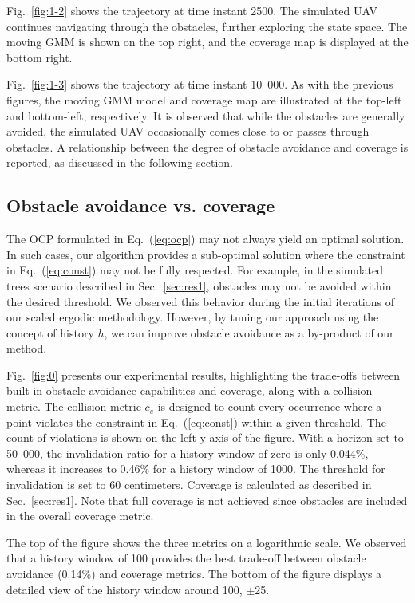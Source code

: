 \documentclass[letterpaper,10pt,conference,twoside]{IEEEtran}
\theoremstyle{definition}
\begin{document}
Fig.~\ref{fig:1-2} shows the trajectory at time instant 2500. The simulated UAV continues navigating through the obstacles, further exploring the state space. The moving GMM is shown on the top right, and the coverage map is displayed at the bottom right.

Fig.~\ref{fig:1-3} shows the trajectory at time instant 10~000. As with the previous figures, the moving GMM model and coverage map are illustrated at the top-left and bottom-left, respectively. It is observed that while the obstacles are generally avoided, the simulated UAV occasionally comes close to or passes through obstacles. A relationship between the degree of obstacle avoidance and coverage is reported, as discussed in the following section.


\subsection{Obstacle avoidance vs. coverage}\label{sec:res2}
\noindent
The OCP formulated in Eq.~(\ref{eq:ocp}) may not always yield an optimal solution. In such cases, our algorithm provides a sub-optimal solution where the constraint in Eq.~(\ref{eq:const}) may not be fully respected. For example, in the simulated trees scenario described in Sec.~\ref{sec:res1}, obstacles may not be avoided within the desired threshold. We observed this behavior during the initial iterations of our scaled ergodic methodology. However, by tuning our approach using the concept of history $h$, we can improve obstacle avoidance as a by-product of our method.

Fig.~\ref{fig:0} presents our experimental results, highlighting the trade-offs between built-in obstacle avoidance capabilities and coverage, along with a collision metric. The collision metric $c_e$ is designed to count every occurrence where a point violates the constraint in Eq.~(\ref{eq:const}) within a given threshold. The count of violations is shown on the left y-axis of the figure. With a horizon set to 50~000, the invalidation ratio for a history window of zero is only 0.044\%, whereas it increases to 0.46\% for a history window of 1000. The threshold for invalidation is set to 60 centimeters. Coverage is calculated as described in Sec.~\ref{sec:res1}. Note that full coverage is not achieved since obstacles are included in the overall coverage metric.

The top of the figure shows the three metrics on a logarithmic scale. We observed that a history window of 100 provides the best trade-off between obstacle avoidance (0.14\%) and coverage metrics. The bottom of the figure displays a detailed view of the history window around 100, $\pm$25.
\end{document}
